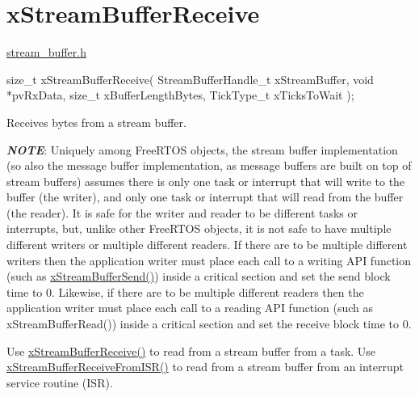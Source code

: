 \hypertarget{group__x_stream_buffer_receive}{}\section{x\+Stream\+Buffer\+Receive}
\label{group__x_stream_buffer_receive}
\mbox{\hyperlink{stream__buffer_8h}{stream\+\_\+buffer.\+h}}


\begin{DoxyPre}
size\_t xStreamBufferReceive( StreamBufferHandle\_t xStreamBuffer,
                             void *pvRxData,
                             size\_t xBufferLengthBytes,
                             TickType\_t xTicksToWait );
\end{DoxyPre}


Receives bytes from a stream buffer.

{\itshape {\bfseries{N\+O\+TE}}}\+: Uniquely among Free\+R\+T\+OS objects, the stream buffer implementation (so also the message buffer implementation, as message buffers are built on top of stream buffers) assumes there is only one task or interrupt that will write to the buffer (the writer), and only one task or interrupt that will read from the buffer (the reader). It is safe for the writer and reader to be different tasks or interrupts, but, unlike other Free\+R\+T\+OS objects, it is not safe to have multiple different writers or multiple different readers. If there are to be multiple different writers then the application writer must place each call to a writing A\+PI function (such as \mbox{\hyperlink{stream__buffer_8h_a35cdf3b6bf677086b9128782f762499d}{x\+Stream\+Buffer\+Send()}}) inside a critical section and set the send block time to 0. Likewise, if there are to be multiple different readers then the application writer must place each call to a reading A\+PI function (such as x\+Stream\+Buffer\+Read()) inside a critical section and set the receive block time to 0.

Use \mbox{\hyperlink{stream__buffer_8h_a55efc144b988598d84a6087d3e20b507}{x\+Stream\+Buffer\+Receive()}} to read from a stream buffer from a task. Use \mbox{\hyperlink{stream__buffer_8h_a6c882a1d9f26c40f93f271bd1b844b3b}{x\+Stream\+Buffer\+Receive\+From\+I\+S\+R()}} to read from a stream buffer from an interrupt service routine (I\+SR).


